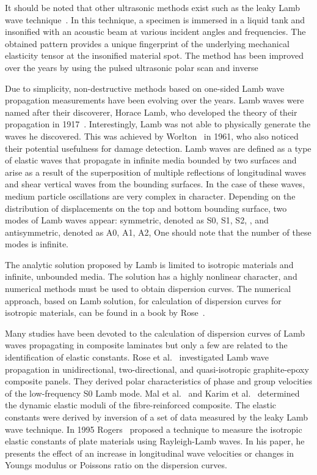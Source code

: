 	 It should be noted that other ultrasonic methods exist such as the leaky Lamb wave technique~\cite{Karim1990,Karim1990a}. In this technique, a specimen is immersed in a liquid tank and insonified with an acoustic beam at various incident angles and frequencies. The obtained pattern provides a unique fingerprint of the underlying mechanical elasticity tensor at the insonified material spot. The method has been improved over the years by using the pulsed ultrasonic polar scan and inverse   
	 
	 Due to simplicity, non-destructive methods based on one-sided Lamb wave propagation measurements have been evolving over the years.
	Lamb waves were named after their discoverer, Horace Lamb, who developed the theory of their propagation in 1917~\cite{Lamb1917}. Interestingly, Lamb was not able to physically generate the waves he discovered. This was achieved by Worlton~\cite{Worlton1961} in 1961, who also noticed their potential usefulness for damage detection. Lamb waves are defined as a type of elastic waves that propagate in infinite media bounded by two surfaces and arise as a result of the superposition of multiple reflections of longitudinal waves and shear vertical waves from the bounding surfaces. In the case of these waves, medium particle oscillations are very complex in character. Depending on the distribution of displacements on the top and bottom bounding surface, two modes of Lamb waves appear: symmetric, denoted as S0, S1, S2, , and antisymmetric, denoted as A0, A1, A2,  One should note that the number of these modes is infinite.
	
	The analytic solution proposed by Lamb is limited to isotropic materials and infinite, unbounded media. The solution has a highly nonlinear character, and numerical methods must be used to obtain dispersion curves. The numerical approach, based on Lamb solution, for calculation of dispersion curves for isotropic materials, can be found in a book by Rose~\cite{Rose1999}.
	
	Many studies have been devoted to the calculation of dispersion curves of Lamb waves propagating in composite laminates but only a few are related to the identification of elastic constants. Rose et al.~\cite{Rose1987} investigated Lamb wave propagation in unidirectional, two-directional, and quasi-isotropic graphite-epoxy composite panels. They derived polar characteristics of phase and group velocities of the low-frequency S0 Lamb mode. Mal et al.~\cite{Mal1993} and Karim et al.~\cite{Karim1990} determined the dynamic elastic moduli of the fibre-reinforced composite. The elastic constants were derived by inversion of a set of data measured by the leaky Lamb wave technique. In 1995 Rogers~\cite{Rogers1995} proposed a technique to measure the isotropic elastic constants of plate materials using Rayleigh-Lamb waves. In his paper, he presents the effect of an increase in longitudinal wave velocities or changes in Youngs modulus or Poissons ratio on the dispersion curves.
	
